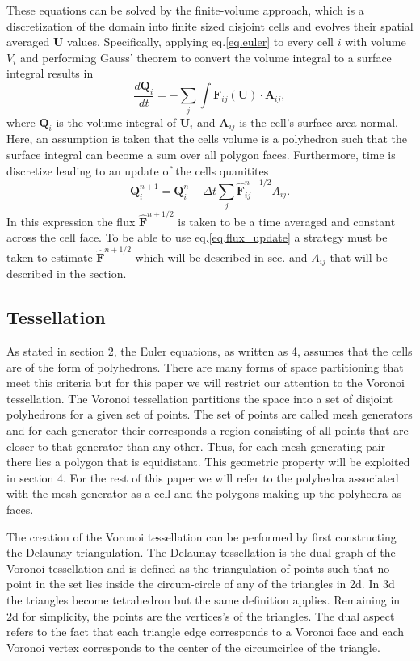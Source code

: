 These equations can be solved by the finite-volume approach, which is a discretization
of the domain into finite sized disjoint cells and evolves their spatial averaged
$\mathbf{U}$ values. Specifically, applying eq.\ref{eq.euler} to every cell $i$ with
volume $V_i$ and performing Gauss' theorem to convert the volume integral to a
surface integral results in
%
\begin{equation}
    \label{eq.euler_int}
    \frac{d\mathbf{Q}_i}{dt} =
    -\sum_{j}\int\mathbf{F}_{ij}(\mathbf{U})\cdot\mathbf{A}_{ij},
\end{equation}
%
where $\mathbf{Q}_i$ is the volume integral of $\mathbf{U}_i$ and $\mathbf{A}_{ij}$ is the
cell's surface area normal. Here, an assumption is taken that the cells volume is a polyhedron
such that the surface integral can become a sum over all polygon faces. Furthermore, time
is discretize leading to an update of the cells quanitites
%
\begin{equation}
    \label{eq.flux_update}
    \mathbf{Q}_i^{n+1} = \mathbf{Q}_i^n - \Delta t\sum_j \mathbf{\hat{F}}_{ij}^{n+1/2} A_{ij}.
\end{equation}
%
In this expression the flux $\mathbf{\hat{F}}^{n+1/2}$ is taken to be a time averaged and
constant across the cell face. To be able to use eq.\ref{eq.flux_update} a strategy must
be taken to estimate $\mathbf{\hat{F}}^{n+1/2}$ which will be described in sec. and $A_{ij}$
that will be described in the section.

\subsection{Tessellation}
As stated in section 2, the Euler equations, as written as 4, assumes that the cells are of the
form of polyhedrons. There are many forms of space partitioning that meet this criteria but for
this paper we will restrict our attention to the Voronoi tessellation. The Voronoi tessellation
partitions the space into a set of disjoint polyhedrons for a given set of points. The set of
points are called mesh generators and for each generator their corresponds a region consisting of
all points that are closer to that generator than any other. Thus, for each mesh generating pair
there lies a polygon that is equidistant. This geometric property will be exploited in section 4.
For the rest of this paper we will refer to the polyhedra associated with the mesh generator as 
a cell and the polygons making up the polyhedra as faces.

The creation of the Voronoi tessellation can be performed by first constructing the Delaunay
triangulation. The Delaunay tessellation is the dual graph of the Voronoi tessellation and is
defined as the triangulation of points such that no point in the set lies inside the 
circum-circle of any of the triangles in 2d. In 3d the triangles become tetrahedron but
the same definition applies. Remaining in 2d for simplicity, the points are the vertices's
of the triangles. The dual aspect refers to the fact that each triangle edge corresponds to
a Voronoi face and each Voronoi vertex corresponds to the center of the circumcirlce of the
triangle. 


